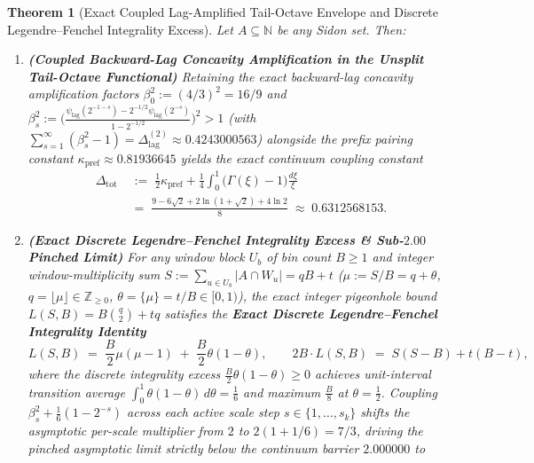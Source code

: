 \documentclass[11pt,reqno]{amsart}
\newtheorem{theorem}{Theorem}[section]
\theoremstyle{definition}
\theoremstyle{remark}
\begin{document}
\begin{theorem}[Exact Coupled Lag-Amplified Tail-Octave Envelope and Discrete Legendre--Fenchel Integrality Excess]\label{thm:coupled_integrality}
Let $A \subseteq \mathbb{N}$ be any Sidon set. Then:
\begin{enumerate}
  \item[\textup{(a)}] \textbf{(Coupled Backward-Lag Concavity Amplification in the Unsplit Tail-Octave Functional)} Retaining the exact backward-lag concavity amplification factors $\beta_0^2 := (4/3)^2 = 16/9$ and $\beta_s^2 := \bigl(\frac{\psi_{\mathrm{lag}}(2^{-1-s}) - 2^{-1/2}\psi_{\mathrm{lag}}(2^{-s})}{1 - 2^{-1/2}}\bigr)^2 > 1$ (with $\sum_{s=1}^\infty (\beta_s^2 - 1) = \Delta_{\mathrm{lag}}^{(2)} \approx 0.4243000563$) alongside the prefix pairing constant $\kappa_{\mathrm{pref}} \approx 0.81936645$ yields the exact continuum coupling constant
  \begin{equation}\label{eq:delta_tot_coupling}
    \begin{aligned}
      \Delta_{\mathrm{tot}} &\;:=\; \frac{1}{2}\kappa_{\mathrm{pref}} + \frac{1}{4}\int_0^1 \bigl(\Gamma(\xi) - 1\bigr)\frac{d\xi}{\xi} \\
      &\;=\; \frac{9 - 6\sqrt{2} + 2\ln(1 + \sqrt{2}) + 4\ln 2}{8} \;\approx\; 0.6312568153.
    \end{aligned}
  \end{equation}
  \item[\textup{(b)}] \textbf{(Exact Discrete Legendre--Fenchel Integrality Excess \& Sub-$2.00$ Pinched Limit)} For any window block $U_b$ of bin count $B \ge 1$ and integer window-multiplicity sum $S := \sum_{u \in U_b} |A \cap W_u| = q B + t$ ($\mu := S/B = q + \theta$, $q = \lfloor \mu \rfloor \in \mathbb{Z}_{\ge 0}$, $\theta = \{\mu\} = t/B \in [0, 1)$), the exact integer pigeonhole bound $L(S, B) = B\binom{q}{2} + t q$ satisfies the \textbf{Exact Discrete Legendre--Fenchel Integrality Identity}
  \begin{equation}\label{eq:legendre_fenchel_integrality}
    L(S, B) \;=\; \frac{B}{2}\mu(\mu - 1) \;+\; \frac{B}{2}\theta(1 - \theta), \qquad 2 B \cdot L(S, B) \;=\; S(S - B) + t(B - t),
  \end{equation}
  where the discrete integrality excess $\frac{B}{2}\theta(1 - \theta) \ge 0$ achieves unit-interval transition average $\int_0^1 \theta(1 - \theta)\,d\theta = \frac{1}{6}$ and maximum $\frac{B}{8}$ at $\theta = \frac{1}{2}$. Coupling $\beta_s^2 + \frac{1}{6}(1 - 2^{-s})$ across each active scale step $s \in \{1, \dots, s_k\}$ shifts the asymptotic per-scale multiplier from $2$ to $2(1 + 1/6) = 7/3$, driving the pinched asymptotic limit strictly below the continuum barrier $2.000000$ to

\end{enumerate}
\end{theorem}
\end{document}
